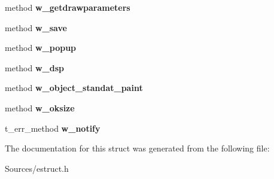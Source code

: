 \begin{DoxyCompactItemize}
\item 
\hypertarget{struct__ewidget_a5eb6013a425a581ee41c734f44eb5255}{method {\bfseries w\-\_\-getdrawparameters}}\label{struct__ewidget_a5eb6013a425a581ee41c734f44eb5255}

\item 
\hypertarget{struct__ewidget_a18f2be4123b21b24c9f2673d22eea9fb}{method {\bfseries w\-\_\-save}}\label{struct__ewidget_a18f2be4123b21b24c9f2673d22eea9fb}

\item 
\hypertarget{struct__ewidget_ad375827ec0dc5f2c712ba6f51608a44a}{method {\bfseries w\-\_\-popup}}\label{struct__ewidget_ad375827ec0dc5f2c712ba6f51608a44a}

\item 
\hypertarget{struct__ewidget_a6a3bf35bdca1508f50b885654b8fa8a1}{method {\bfseries w\-\_\-dsp}}\label{struct__ewidget_a6a3bf35bdca1508f50b885654b8fa8a1}

\item 
\hypertarget{struct__ewidget_a96ed05177c8899ca783c09f55229fc36}{method {\bfseries w\-\_\-object\-\_\-standat\-\_\-paint}}\label{struct__ewidget_a96ed05177c8899ca783c09f55229fc36}

\item 
\hypertarget{struct__ewidget_aef2440efc520270b766899eac0c50eaa}{method {\bfseries w\-\_\-oksize}}\label{struct__ewidget_aef2440efc520270b766899eac0c50eaa}

\item 
\hypertarget{struct__ewidget_ad60d080025f2fca515c7346761c0ded7}{t\-\_\-err\-\_\-method {\bfseries w\-\_\-notify}}\label{struct__ewidget_ad60d080025f2fca515c7346761c0ded7}

\end{DoxyCompactItemize}


The documentation for this struct was generated from the following file\-:\begin{DoxyCompactItemize}
\item 
Sources/estruct.\-h\end{DoxyCompactItemize}
